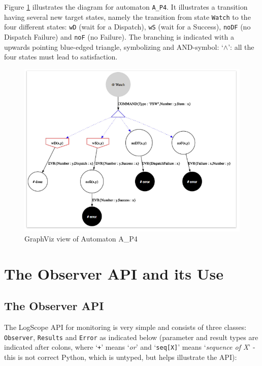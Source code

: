 \documentclass{report}
\newcommand{\python}{{\sc Python}}
\newcommand{\logscope}{{\sc LogScope}}
\begin{document}
Figure \ref{fig:vizA_P4} illustrates the diagram for automaton {\tt A\_P4}. It illustrates a transition having several
new target states, namely the transition from state {\tt Watch} to the four different states: {\tt wD} (wait for a Dispatch), 
{\tt wS} (wait for a Success), {\tt noDF} (no Dispatch Failure) and {\tt noF} (no Failure). The branching is indicated
with a upwards pointing blue-edged triangle, symbolizing and AND-symbol: `$\wedge$': all the four states must lead to satisfaction.

\begin{figure}
\begin{center}
\includegraphics[width=1.0\textwidth]{graphics/A_P4}
\caption{GraphViz view of Automaton A\_P4}
\label{fig:vizA_P4}
\end{center}
\end{figure}


\chapter{The Observer API and its Use}

\section{The Observer API}

The \logscope{} API for monitoring is very simple and consists of three classes: {\tt Observer}, {\tt Results} and {\tt Error} as indicated below (parameter and result types are indicated after colons, where `{\tt +}' means `{\em or}' and `{\tt seq[X]}' means `{\em sequence of X}' - this is not correct \python{}, which is untyped, but helps illustrate the API):
\end{document}

